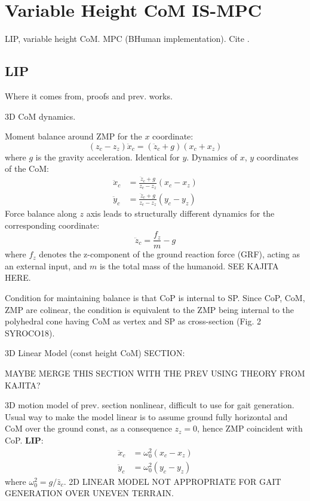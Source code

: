 \chapter{Variable Height CoM IS-MPC}
LIP, variable height CoM. MPC (BHuman implementation). Cite
\cite{SYROCO18}.

\section{LIP}
Where it comes from, proofs and prev. works.

3D CoM dynamics.

Moment balance around ZMP for the $x$ coordinate:
\begin{equation}
  (z_c - z_z) \ddot{x}_c = (\ddot{z}_c + g) (x_c + x_z)
\end{equation}
where $g$ is the gravity acceleration. Identical for $y$. Dynamics of $x$, $y$
coordinates of the CoM:
\begin{align}
  \ddot{x}_c &= \frac{\ddot{z}_c + g}{z_c - z_z} (x_c - x_z) \\
  \ddot{y}_c &= \frac{\ddot{z}_c + g}{z_c - z_z} (y_c - y_z)
\end{align}
Force balance along $z$ axis leads to structurally different dynamics for the 
corresponding coordinate:
\begin{equation}
  \ddot{z}_c = \frac{f_z}{m} - g
\end{equation}
where $f_z$ denotes the z-component of the ground reaction force (GRF), acting 
as an external input, and $m$ is the total mass of the humanoid.
SEE KAJITA HERE.

Condition for maintaining balance is that CoP is internal to SP. Since CoP, CoM,
ZMP are colinear, the condition is equivalent to the ZMP being internal to the 
polyhedral cone having CoM as vertex and SP as cross-section (Fig. 2 SYROCO18).

3D Linear Model (const height CoM) SECTION:

MAYBE MERGE THIS SECTION WITH THE PREV USING THEORY FROM KAJITA?

3D motion model of prev. section nonlinear, difficult to use for gait
generation. Usual way to make the model linear is to assume ground fully 
horizontal and CoM over the ground const, as a consequence $z_z = 0$, hence 
ZMP coincident with CoP. \textbf{LIP}:
\begin{align}
  \ddot{x}_c &= \omega_0^2 (x_c - x_z) \\
  \ddot{y}_c &= \omega_0^2 (y_c - y_z)
\end{align}
where $\omega_0^2 = g/\bar{z}_c$. 2D LINEAR MODEL NOT APPROPRIATE FOR GAIT
GENERATION OVER UNEVEN TERRAIN.

